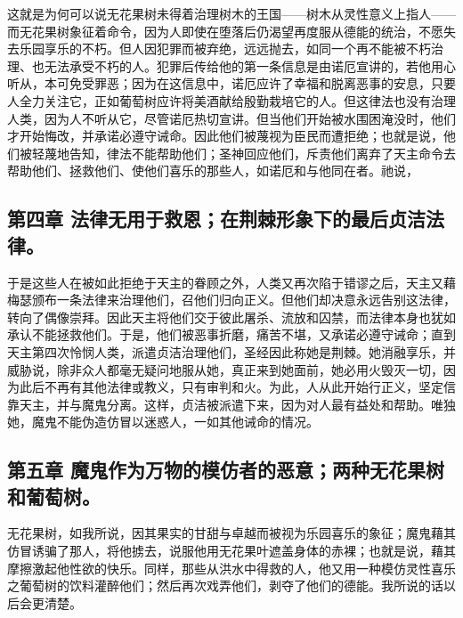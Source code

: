 这就是为何可以说无花果树未得着治理树木的王国——树木从灵性意义上指人——而无花果树象征着命令，因为人即使在堕落后仍渴望再度服从德能的统治，不愿失去乐园享乐的不朽。但人因犯罪而被弃绝，远远抛去，如同一个再不能被不朽治理、也无法承受不朽的人。犯罪后传给他的第一条信息是由诺厄宣讲的，若他用心听从，本可免受罪恶；因为在这信息中，诺厄应许了幸福和脱离恶事的安息，只要人全力关注它，正如葡萄树应许将美酒献给殷勤栽培它的人。但这律法也没有治理人类，因为人不听从它，尽管诺厄热切宣讲。但当他们开始被水围困淹没时，他们才开始悔改，并承诺必遵守诫命。因此他们被蔑视为臣民而遭拒绝；也就是说，他们被轻蔑地告知，律法不能帮助他们；圣神回应他们，斥责他们离弃了天主命令去帮助他们、拯救他们、使他们喜乐的那些人，如诺厄和与他同在者。祂说，\par


\subsection{第四章 法律无用于救恩；在荆棘形象下的最后贞洁法律。}

于是这些人在被如此拒绝于天主的眷顾之外，人类又再次陷于错谬之后，天主又藉梅瑟颁布一条法律来治理他们，召他们归向正义。但他们却决意永远告别这法律，转向了偶像崇拜。因此天主将他们交于彼此屠杀、流放和囚禁，而法律本身也犹如承认不能拯救他们。于是，他们被恶事折磨，痛苦不堪，又承诺必遵守诫命；直到天主第四次怜悯人类，派遣贞洁治理他们，圣经因此称她是荆棘。她消融享乐，并威胁说，除非众人都毫无疑问地服从她，真正来到她面前，她必用火毁灭一切，因为此后不再有其他法律或教义，只有审判和火。为此，人从此开始行正义，坚定信靠天主，并与魔鬼分离。这样，贞洁被派遣下来，因为对人最有益处和帮助。唯独她，魔鬼不能伪造仿冒以迷惑人，一如其他诫命的情况。\par


\subsection{第五章 魔鬼作为万物的模仿者的恶意；两种无花果树和葡萄树。}

无花果树，如我所说，因其果实的甘甜与卓越而被视为乐园喜乐的象征；魔鬼藉其仿冒诱骗了那人，将他掳去，说服他用无花果叶遮盖身体的赤裸；也就是说，藉其摩擦激起他性欲的快乐。同样，那些从洪水中得救的人，他又用一种模仿灵性喜乐之葡萄树的饮料灌醉他们；然后再次戏弄他们，剥夺了他们的德能。我所说的话以后会更清楚。\par

